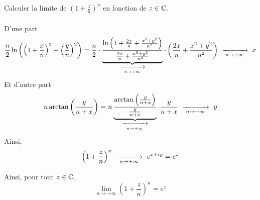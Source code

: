 \documentclass{article}
\begin{document}
\begin{question_kholle}{Calculer la limite de $\displaystyle
			\left(1+\frac{z}{n}\right)^{n}$ en fonction de $z\in\mathbb C$.}
\begin{itemize}[label=$\star$]
\begin{align*}
		      \end{align*}
		      D’une part
		      \begin{align*}
			      \frac{n}{2}\ln \left(\left(1+\frac{x}{n}\right)^{2} + \left(\frac{y}{n}\right)^{2}\right) = \frac{n}{2}\cdot \underbrace{\frac{\ln \left(1+\frac{2x}{n} + \frac{x^{2}+y^{2}}{n^{2}}\right)}{\frac{2x}{n} + \frac{x^{2}+y^{2}}{n^{2}}}}_{\ \xrightarrow[\;n \to +\infty\;]{}\ } \cdot \left(\frac{2x}{n} + \frac{x^{2}+y^{2}}{n^{2}}\right) \ \xrightarrow[\;n \to +\infty\;]{}\  x
		      \end{align*}
		      Et d’autre part
		      \[
			      n\arctan \left(\frac{y}{n+x}\right) = n \underbrace{\frac{\arctan \left(\frac{y}{n+x}\right)}{\frac{y}{n+x}}}_{\ \xrightarrow[\;n \to +\infty\;]{}\ }\cdot \frac{y}{n+x} \ \xrightarrow[\;n \to +\infty\;]{}\  y
		      \]
		      Ainsi,
		      \[
			      \left(1+\frac{z}{n}\right)^{n} \ \xrightarrow[\;n \to +\infty\;]{}\  e^{x+iy} = e^{z}
		      \]

	\end{itemize}
	Ainsi, pour tout $z\in\mathbb C$,
	\[
		\lim_{n\to+\infty} \left(1+\frac{z}{n}\right)^{n}=e^{z}
	\]

\end{question_kholle}
\end{document}
